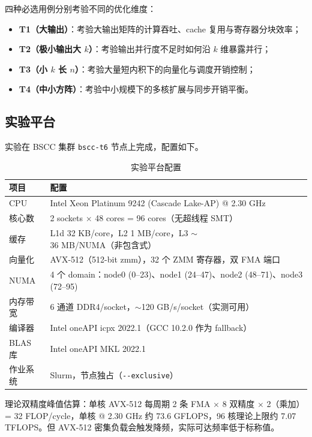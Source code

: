 \documentclass[11pt,a4paper,fontset=fandol]{ctexart}
\begin{document}
四种必选用例分别考验不同的优化维度：
\begin{itemize}[leftmargin=2.4em]
  \item \textbf{T1（大输出）}：考验大输出矩阵的计算吞吐、cache 复用与寄存器分块效率；
  \item \textbf{T2（极小输出大 $k$）}：考验输出并行度不足时如何沿 $k$ 维暴露并行；
  \item \textbf{T3（小 $k$ 长 $n$）}：考验大量短内积下的向量化与调度开销控制；
  \item \textbf{T4（中小方阵）}：考验中小规模下的多核扩展与同步开销平衡。
\end{itemize}

\subsection{实验平台}
实验在 BSCC 集群 \texttt{bscc-t6} 节点上完成，配置如下。

\begin{table}[H]
\centering
\caption{实验平台配置}
\small
\begin{tabular}{ll}
\toprule
项目 & 配置 \\
\midrule
CPU & Intel Xeon Platinum 9242 (Cascade Lake-AP) @ 2.30 GHz \\
核心数 & 2 sockets $\times$ 48 cores = 96 cores（无超线程 SMT） \\
缓存 & L1d 32 KB/core，L2 1 MB/core，L3 $\sim$36 MB/NUMA（非包含式） \\
向量化 & AVX-512（512-bit zmm），32 个 ZMM 寄存器，双 FMA 端口 \\
NUMA & 4 个 domain：node0 (0--23)、node1 (24--47)、node2 (48--71)、node3 (72--95) \\
内存带宽 & 6 通道 DDR4/socket，$\sim$120 GB/s/socket（实测可用） \\
编译器 & Intel oneAPI icpx 2022.1（GCC 10.2.0 作为 fallback） \\
BLAS 库 & Intel oneAPI MKL 2022.1 \\
作业系统 & Slurm，节点独占（\texttt{-{}-exclusive}） \\
\bottomrule
\end{tabular}
\end{table}

理论双精度峰值估算：单核 AVX-512 每周期 2 条 FMA $\times$ 8 双精度 $\times$ 2（乘加）= 32 FLOP/cycle，单核 @ 2.30 GHz 约 73.6 GFLOPS，96 核理论上限约 7.07 TFLOPS。但 AVX-512 密集负载会触发降频，实际可达频率低于标称值。
\end{document}
